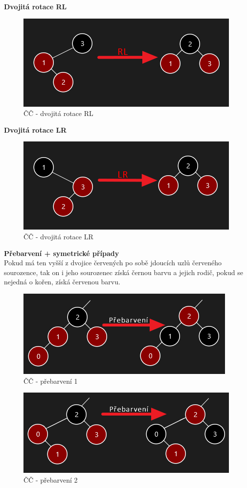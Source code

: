 \documentclass[
  biblatex=false,
  font=serif,
  glossaries=false,
  tables=false,
  theorems=false,
  index
]{kidiplom}
\begin{document}
\newpage
\noindent\textbf{Dvojitá rotace RL}
\begin{figure}[h!]
\centering
	\includegraphics[scale=0.8]{obrazky/20RL.png}
	\caption{ČČ - dvojitá rotace RL}
\end{figure}

\noindent\textbf{Dvojitá rotace LR}
\begin{figure}[h!]
\centering
	\includegraphics[scale=0.8]{obrazky/21LR.png}
	\caption{ČČ - dvojitá rotace LR}
\end{figure}

\noindent\textbf{Přebarvení + symetrické případy}\\
Pokud má ten vyšší z dvojice červených po sobě jdoucích uzlů červeného sourozence, tak on i jeho sourozenec získá černou barvu a jejich rodič, pokud se nejedná o kořen, získá červenou barvu.\\
\begin{figure}[h!]
\centering
	\includegraphics[scale=0.8]{obrazky/22Prebarveni.png}
	\caption{ČČ - přebarvení 1}
\end{figure}

\begin{figure}[h!]
\centering
	\includegraphics[scale=0.8]{obrazky/23Prebarveni.png}
	\caption{ČČ - přebarvení 2}
\end{figure}
\newpage
\end{document}
